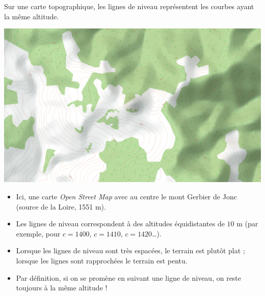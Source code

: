 \begin{exemple}{}{}
	Sur une carte topographique, les lignes de niveau représentent les courbes ayant la même altitude. 
	\begin{center}
		\includegraphics[scale=0.3]{figures/fig-fonctions-topo}
	\end{center}
	\begin{itemize}
		\item Ici, une carte \emph{Open Street Map} avec au centre le mont Gerbier de Jonc (source de la Loire, 1551 m). 
		\item Les lignes de niveau correspondent à des altitudes équidistantes de $10$ m (par exemple, pour $c=1400$, $c=1410$, $c=1420$\ldots).
		\item Lorsque les lignes de niveau sont très espacées, le terrain est plutôt plat ; lorsque les lignes sont rapprochées le terrain est pentu.
		\item Par définition, si on se promène en suivant une ligne de niveau, on reste toujours à la même altitude !
	\end{itemize}
\end{exemple}



